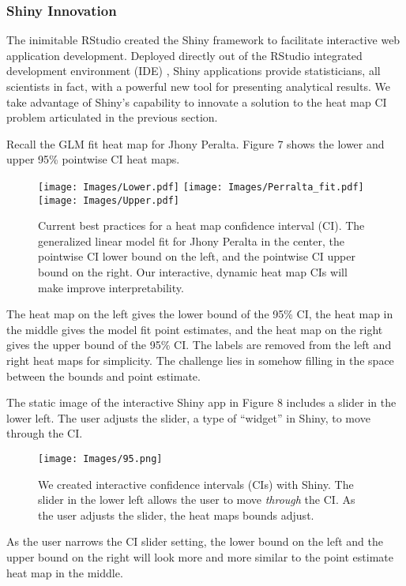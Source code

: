 \subsubsection{Shiny Innovation}

The inimitable RStudio created the Shiny framework to facilitate interactive web application development. Deployed directly out of the RStudio integrated development environment (IDE) \citep{IDE}, Shiny applications provide statisticians, all scientists in fact, with a powerful new tool for presenting analytical results. We take advantage of Shiny's capability to innovate a solution to the heat map CI problem articulated in the previous section.

Recall the GLM fit heat map for Jhony Peralta. Figure 7 shows the lower and upper 95\% pointwise CI heat maps.

  \begin{figure}[H]
	\centering
	\texttt{[image: Images/Lower.pdf]}
	\texttt{[image: Images/Perralta\_fit.pdf]}
	\texttt{[image: Images/Upper.pdf]}
	\caption{Current best practices for a heat map confidence interval (CI). The generalized linear model fit for Jhony Peralta in the center, the pointwise CI lower bound on the left, and the pointwise CI upper bound on the right. Our interactive, dynamic heat map CIs will make improve interpretability.}
	\end{figure}
The heat map on the left gives the lower bound of the 95\% CI, the heat map in the middle gives the model fit point estimates, and the heat map on the right gives the upper bound of the 95\% CI. The labels are removed from the left and right heat maps for simplicity. The challenge lies in somehow filling in the space between the bounds and point estimate.

The static image of the interactive Shiny app in Figure 8 includes a slider in the lower left. The user adjusts the slider, a type of ``widget'' in Shiny, to move through the CI.

  \begin{figure}[H]
	\centering
	\texttt{[image: Images/95.png]}
	\caption{We created interactive confidence intervals (CIs) with Shiny. The slider in the lower left allows the user to move {\it through} the CI. As the user adjusts the slider, the heat maps bounds adjust.}
	\end{figure}

As the user narrows the CI slider setting, the lower bound on the left and the upper bound on the right will look more and more similar to the point estimate heat map in the middle.

